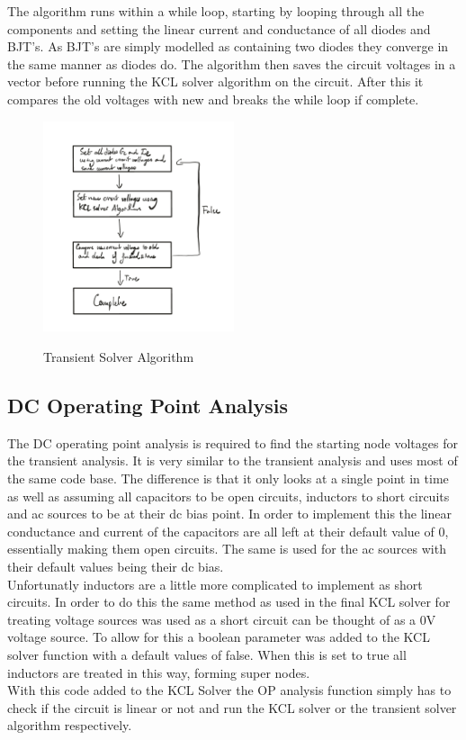 \documentclass{article}
\begin{document}
The algorithm runs within a while loop, starting by looping through all the components and setting the linear current and conductance of all diodes and BJT's. As BJT's are simply modelled as containing two diodes they converge in the same manner as diodes do. The algorithm then saves the circuit voltages in a vector before running the KCL solver algorithm on the circuit. After this it compares the old voltages with new and breaks the while loop if complete.  

\begin{figure}[h]
    \caption{Transient Solver Algorithm}
    \centering
    \includegraphics[width=0.5\textwidth]{images/TransientSolverAlgorithm.png}
    \label{fig:transient}
\end{figure}

\newpage

\subsection{DC Operating Point Analysis}
The DC operating point analysis is required to find the starting node voltages for the transient analysis. It is very similar to the transient analysis and uses most of the same code base. The difference is that it only looks at a single point in time as well as assuming all capacitors to be open circuits, inductors to short circuits and ac sources to be at their dc bias point. In order to implement this the linear conductance and current of the capacitors are all left at their default value of 0, essentially making them open circuits. The same is used for the ac sources with their default values being their dc bias.\\Unfortunatly inductors are a little more complicated to implement as short circuits. In order to do this the same method as used in the final KCL solver for treating voltage sources was used as a short circuit can be thought of as a 0V voltage source. To allow for this a boolean parameter was added to the KCL solver function with a default values of false. When this is set to true all inductors are treated in this way, forming super nodes.\\
With this code added to the KCL Solver the OP analysis function simply has to check if the circuit is linear or not and run the KCL solver or the transient solver algorithm respectively. 
\newpage
\end{document}
